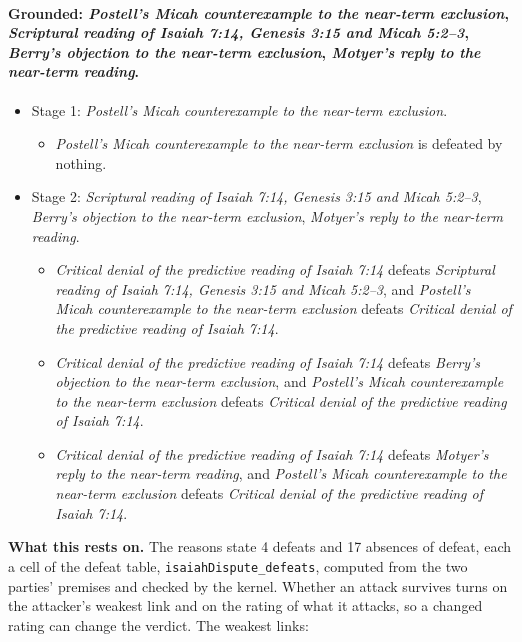 \documentclass[11pt]{article}
\begin{document}
\paragraph{Grounded: \emph{Postell's Micah counterexample to the near-term exclusion}, \emph{Scriptural reading of Isaiah 7:14, Genesis 3:15 and Micah 5:2–3}, \emph{Berry's objection to the near-term exclusion}, \emph{Motyer's reply to the near-term reading}.}
\begin{itemize}
\item Stage 1: \emph{Postell's Micah counterexample to the near-term exclusion}.
\begin{itemize}
\item \emph{Postell's Micah counterexample to the near-term exclusion} is defeated by nothing.
\end{itemize}
\item Stage 2: \emph{Scriptural reading of Isaiah 7:14, Genesis 3:15 and Micah 5:2–3}, \emph{Berry's objection to the near-term exclusion}, \emph{Motyer's reply to the near-term reading}.
\begin{itemize}
\item \emph{Critical denial of the predictive reading of Isaiah 7:14} defeats \emph{Scriptural reading of Isaiah 7:14, Genesis 3:15 and Micah 5:2–3}, and \emph{Postell's Micah counterexample to the near-term exclusion} defeats \emph{Critical denial of the predictive reading of Isaiah 7:14}.
\item \emph{Critical denial of the predictive reading of Isaiah 7:14} defeats \emph{Berry's objection to the near-term exclusion}, and \emph{Postell's Micah counterexample to the near-term exclusion} defeats \emph{Critical denial of the predictive reading of Isaiah 7:14}.
\item \emph{Critical denial of the predictive reading of Isaiah 7:14} defeats \emph{Motyer's reply to the near-term reading}, and \emph{Postell's Micah counterexample to the near-term exclusion} defeats \emph{Critical denial of the predictive reading of Isaiah 7:14}.
\end{itemize}
\end{itemize}
\par\noindent\textbf{What this rests on.} The reasons state 4 defeats and 17 absences of defeat, each a cell of the defeat table, \texttt{isaiah\allowbreak{}Dispute\_\allowbreak{}defeats}, computed from the two parties' premises and checked by the kernel. Whether an attack survives turns on the attacker's weakest link and on the rating of what it attacks, so a changed rating can change the verdict. The weakest links:
\end{document}
